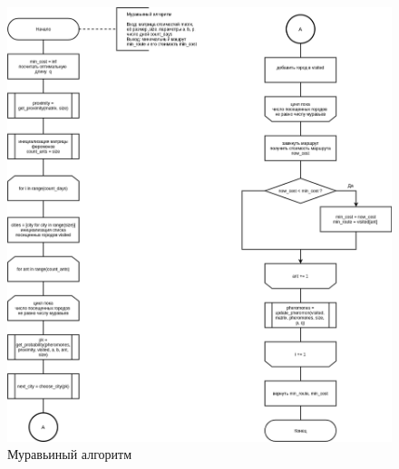 \begin{figure}[H]
	\begin{center}
		\includegraphics[scale=0.4]{img/ant.png}
	\end{center}
	\captionsetup{justification=centering}
	\caption{Муравьиный алгоритм}
	\label{img:ant}
\end{figure}

